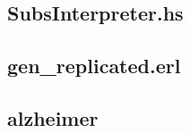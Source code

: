 \documentclass[a4paper]{article}
\begin{document}
\newpage
\subsection{SubsInterpreter.hs}\label{src_Interpreter}


\newpage
\subsection{gen\_replicated.erl}\label{src_Genrep}


\newpage
\subsection{alzheimer}\label{src_Alz}

\end{document}
